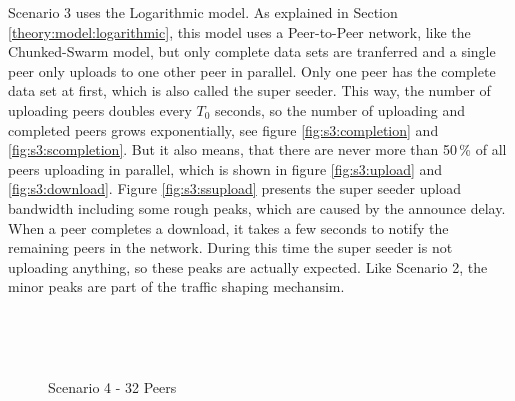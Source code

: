 Scenario 3 uses the Logarithmic model. As explained in Section \ref{theory:model:logarithmic}, this model uses a Peer-to-Peer network, like the Chunked-Swarm model, but only complete data sets are tranferred and a single peer only uploads to one other peer in parallel. Only one peer has the complete data set at first, which is also called the super seeder. This way, the number of uploading peers doubles every $T_0$ seconds, so the number of uploading and completed peers grows exponentially, see figure \ref{fig:s3:completion} and \ref{fig:s3:scompletion}. But it also means, that there are never more than 50\,\% of all peers uploading in parallel, which is shown in figure \ref{fig:s3:upload} and \ref{fig:s3:download}. Figure \ref{fig:s3:ssupload} presents the super seeder upload bandwidth including some rough peaks, which are caused by the announce delay. When a peer completes a download, it takes a few seconds to notify the remaining peers in the network. During this time the super seeder is not uploading anything, so these peaks are actually expected. Like Scenario 2, the minor peaks are part of the traffic shaping mechansim.

\vfill


\pagebreak
\begin{figure}[!ht]
	\begin{center}	
		~ %

	 	~ %

		\caption{Scenario 4 - 32 Peers}
		\label{fig:s4}
	\end{center}
\end{figure}
\vfill

